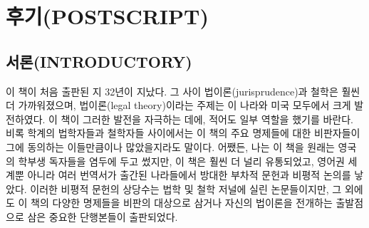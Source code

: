 \section{후기(POSTSCRIPT)}\label{uxd6c4uxae30postscript}

\setcounter{footnote}{0}

\subsection{서론(INTRODUCTORY)}\label{uxc11cuxb860introductory}

이 책이 처음 출판된 지 32년이 지났다. 그 사이 법이론(jurisprudence)과
철학은 훨씬 더 가까워졌으며, 법이론(legal theory)이라는 주제는 이 나라와
미국 모두에서 크게 발전하였다. 이 책이 그러한 발전을 자극하는 데에,
적어도 일부 역할을 했기를 바란다. 비록 학계의 법학자들과 철학자들
사이에서는 이 책의 주요 명제들에 대한 비판자들이 그에 동의하는
이들만큼이나 많았을지라도 말이다. 어쨌든, 나는 이 책을 원래는 영국의
학부생 독자들을 염두에 두고 썼지만, 이 책은 훨씬 더 널리 유통되었고,
영어권 세계뿐 아니라 여러 번역서가 출간된 나라들에서 방대한 부차적
문헌과 비평적 논의를 낳았다. 이러한 비평적 문헌의 상당수는 법학 및 철학
저널에 실린 논문들이지만, 그 외에도 이 책의 다양한 명제들을 비판의
대상으로 삼거나 자신의 법이론을 전개하는 출발점으로 삼은 중요한
단행본들이 출판되었다.

